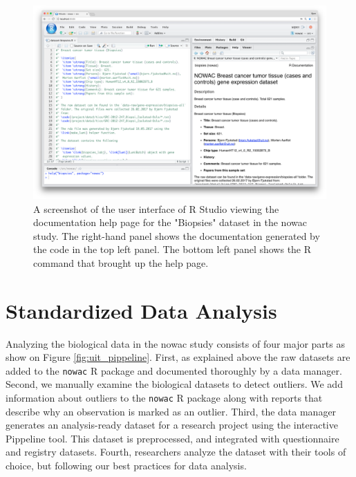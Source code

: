 \begin{figure}
  \includegraphics[width=\linewidth]{figures/rpkg.png}
    \caption[A screenshot of the user interface of R Studio.]{A screenshot of
    the user interface of R Studio viewing the documentation help page for the
    "Biopsies" dataset in the \gls{nowac} study.  The right-hand panel shows the
    documentation generated by the code in the top left panel. The bottom left
    panel shows the R command that brought up the help page.}
    \label{rpkgfig} 
\end{figure}

\section{Standardized Data Analysis}
Analyzing the biological data in the \gls{nowac} study consists of four major
parts as show on Figure \ref{fig:uit_pippeline}. First, as explained above the
raw datasets are added to the \texttt{nowac} R package and documented thoroughly
by a data manager.  Second, we manually examine the biological datasets to
detect outliers. We add information about outliers to the \texttt{nowac} R
package along with reports that describe why an observation is marked as an
outlier.  Third, the data manager generates an analysis-ready dataset for a
research project using the interactive Pippeline tool. This dataset is
preprocessed, and integrated with questionnaire and registry datasets. Fourth,
researchers analyze the dataset with their tools of choice, but following
our best practices for data analysis.

